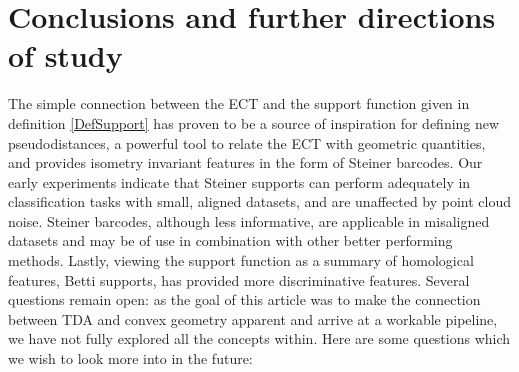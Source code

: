 \documentclass[a4paper]{article}
\begin{document}
\section{Conclusions and further directions of study}
\label{SectConclusion}
The simple connection between the ECT and the support function given in definition \ref{DefSupport} has proven to be a source of inspiration for defining new pseudodistances, a powerful tool to relate the ECT with geometric quantities, and provides isometry invariant features in the form of Steiner barcodes. Our early experiments indicate that Steiner supports can perform adequately in classification tasks with small, aligned datasets, and are unaffected by point cloud noise. Steiner barcodes, although less informative, are applicable in misaligned datasets and may be of use in combination with other better performing methods. Lastly, viewing the support function as a summary of homological features, Betti supports, has provided more discriminative features. Several questions remain open: as the goal of this article was to make the connection between TDA and convex geometry apparent and arrive at a workable pipeline, we have not fully explored all the concepts within. Here are some questions which we wish to look more into in the future:
\end{document}
